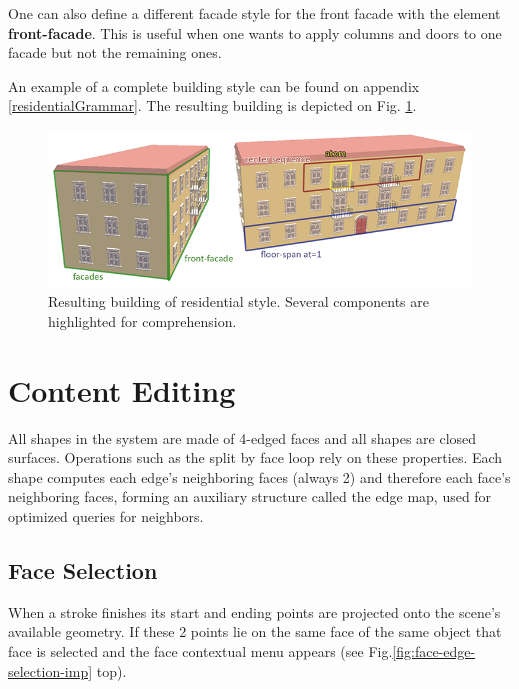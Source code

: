 One can also define a different facade style for the front facade with the element \textbf{front-facade}.
This is useful when one wants to apply columns and doors to one facade but not the remaining ones.


An example of a complete building style can be found on appendix \ref{residentialGrammar}. The resulting building is depicted on
Fig. \ref{fig:style}.

\begin{figure}[ht]
	\centering
		\includegraphics[width=\textwidth]{gfx/style.png}
	\caption{Resulting building of residential style. Several components are highlighted for comprehension.}
	\label{fig:style}
\end{figure}




\section{Content Editing}

All shapes in the system are made of 4-edged faces and all shapes are closed surfaces.
Operations such as the split by face loop rely on these properties.
Each shape computes each edge's neighboring faces (always 2)
and therefore each face's neighboring faces, forming an auxiliary structure called the edge map,
used for optimized queries for neighbors.


\subsection{Face Selection}

When a stroke finishes its start and ending points are projected onto the scene's available geometry.
If these 2 points lie on the same face of the same object that face is selected and the face contextual menu appears
(see Fig.\ref{fig:face-edge-selection-imp} top).

